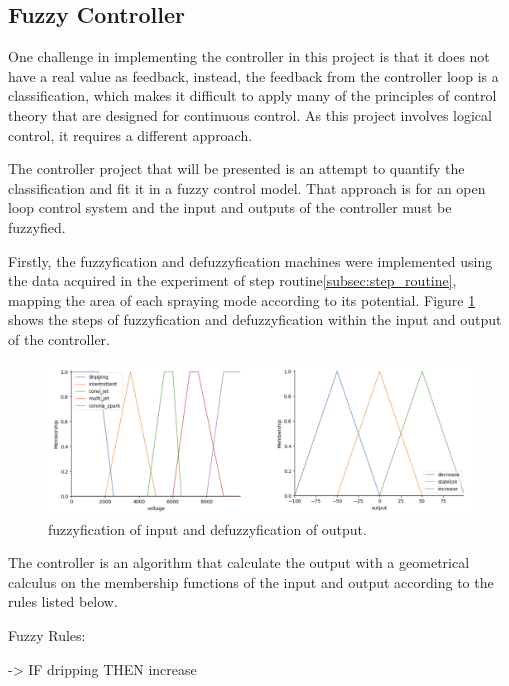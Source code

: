 \subsection{Fuzzy Controller}

        One challenge in implementing the controller in this project is that it does not have a real value as feedback, instead, the feedback from the controller loop is a classification, which makes it difficult to apply many of the principles of control theory that are designed for continuous control. 
        As this project involves logical control, it requires a different approach. 
        
        The controller project that will be presented is an attempt to quantify the classification and fit it in a fuzzy control model.
        That approach is for an open loop control system and the input and outputs of the controller must be fuzzyfied.

        Firstly, the fuzzyfication and defuzzyfication machines were implemented using the data acquired in the experiment of step routine\ref{subsec:step_routine}, mapping the area of each spraying mode according to its potential.
        Figure \ref{fig:fuzzyy} shows the steps of fuzzyfication and defuzzyfication within the input and output of the controller.


            \begin{figure}[H]
                \centering
                \includegraphics[width=17cm]{Figuras/fuzzy/Fuzzyy.png}
                \caption{fuzzyfication of input and defuzzyfication of output.}
                \label{fig:fuzzyy}
            \end{figure}



        The controller is an algorithm that calculate the output with a geometrical calculus on the membership functions of the input and output according to the rules listed below.

        Fuzzy Rules:

        -> IF dripping THEN increase

